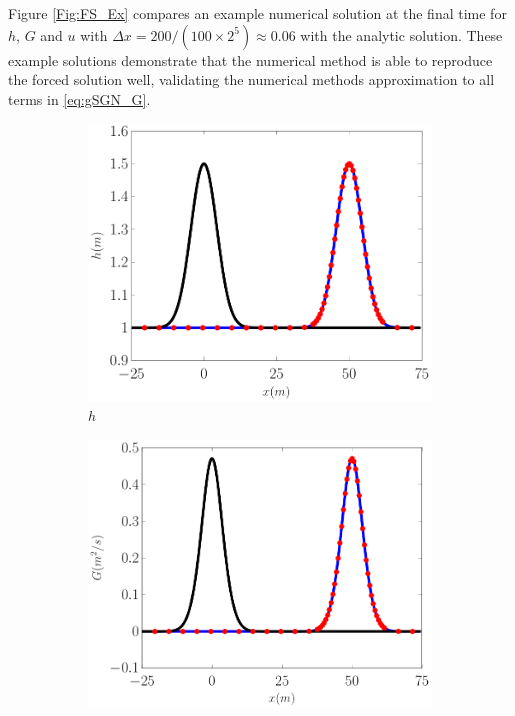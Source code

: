 \documentclass[10pt]{elsarticle}
\begin{document}
Figure \ref{Fig:FS_Ex} compares an example numerical solution at the final time for $h$, $G$ and $u$ with $\Delta x = 200 / (100 \times 2^{5}) \approx 0.06$ with the analytic solution. These example solutions demonstrate that the numerical method is able to reproduce the forced solution well, validating the numerical methods approximation to all terms in \eqref{eq:gSGN_G}. 
%
\begin{figure}
	\centering
	\begin{subfigure}{0.32\textwidth}
		\centering
		\includegraphics[width=\textwidth]{./Figures/Simulations/Validation/Forced/iSGN/h.pdf}
		\caption{$h$}
	\end{subfigure}
	\begin{subfigure}{0.32\textwidth}
		\centering
		\includegraphics[width=\textwidth]{./Figures/Simulations/Validation/Forced/iSGN//G.pdf}

\end{subfigure}
\end{figure}
\end{document}
